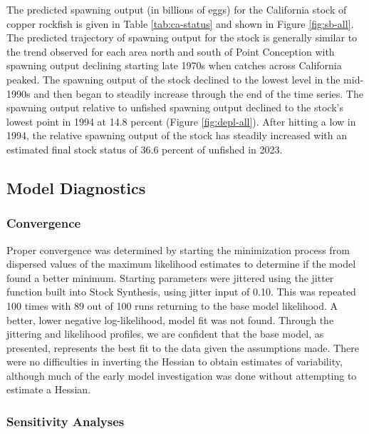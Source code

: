 \documentclass[11pt,
  letterpaper,
]{article}
\begin{document}
The predicted spawning output (in billions of eggs) for the California stock of copper rockfish is given in Table \ref{tab:ca-status} and shown in Figure \ref{fig:sb-all}. The predicted trajectory of spawning output for the stock is generally similar to the trend observed for each area north and south of Point Conception with spawning output declining starting late 1970s when catches across California peaked. The spawning output of the stock declined to the lowest level in the mid-1990s and then began to steadily increase through the end of the time series. The spawning output relative to unfished spawning output declined to the stock's lowest point in 1994 at 14.8 percent (Figure \ref{fig:depl-all}). After hitting a low in 1994, the relative spawning output of the stock has steadily increased with an estimated final stock status of 36.6 percent of unfished in 2023.

\subsection{Model Diagnostics}\label{model-diagnostics}

\subsubsection{Convergence}\label{convergence}

Proper convergence was determined by starting the minimization process from dispersed values of the maximum likelihood estimates to determine if the model found a better minimum. Starting parameters were jittered using the jitter function built into Stock Synthesis, using jitter input of 0.10. This was repeated 100 times with 89 out of 100 runs returning to the base model likelihood. A better, lower negative log-likelihood, model fit was not found. Through the jittering and likelihood profiles, we are confident that the base model, as presented, represents the best fit to the data given the assumptions made. There were no difficulties in inverting the Hessian to obtain estimates of variability, although much of the early model investigation was done without attempting to estimate a Hessian.

\subsubsection{Sensitivity Analyses}\label{sensitivities}
\end{document}
